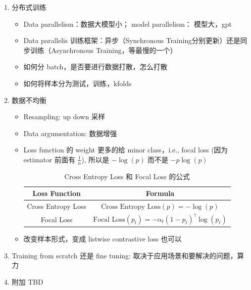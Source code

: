 \documentclass[12pt]{article}
\numberwithin{theorem}{section} %
\numberwithin{definition}{section} %
\numberwithin{assumption}{section} %
\numberwithin{lemma}{section} %
\numberwithin{remark}{section} %
\numberwithin{prop}{section} %
\numberwithin{corollary}{section} %
\numberwithin{example}{section} %
\numberwithin{question}{section} %
\numberwithin{problem}{section} %
\numberwithin{conjecture}{section} %
\numberwithin{append}{section} %
\numberwithin{property}{section} %
\begin{document}
\begin{CJK}{UTF8}{gbsn}
\begin{enumerate}
			\item 分布式训练
			\begin{itemize}
				\item Data parallelism：数据大模型小； model parallelism： 模型大，gpt
				\item Data parallelis 训练框架：异步（Synchronous Training分别更新）还是同步训练（Asynchronous Training，等最慢的一个）
				\item 如何分 batch，是否要进行数据打散，怎么打散
				\item 如何将样本分为测试，训练，kfolds
			\end{itemize}
			\item 数据不均衡
			\begin{itemize}
				\item Resampling: up down 采样
				\item Data argumentation: 数据增强
				\item Loss function 的 weight 更多的给 minor class，i.e.,  focal loss	(因为 estimator 前面有 $\frac{1}{n}$), 所以是	$-\log(p) $	而不是 $-p\log(p) $
				\begin{table}[h]
					\centering
					\begin{tabular}{cc}
						\toprule
						\textbf{Loss Function} & \textbf{Formula} \\ 
						\midrule
						Cross Entropy Loss & 
						$ \text{Cross Entropy Loss}(p) = -\log(p) $ \\ 
						\midrule
						Focal Loss & 
						$ \text{Focal Loss}(p_t) = -\alpha_t (1 - p_t)^\gamma \log(p_t) $ \\ 
						\bottomrule
					\end{tabular}
					\caption{Cross Entropy Loss 和 Focal Loss 的公式}
					\label{tab:loss_functions}
				\end{table}
			\item 改变样本形式，变成 listwise contrastive loss 也可以
		\end{itemize}
		\item Training from scratch 还是 fine tuning: 取决于应用场景和要解决的问题，算力
		\item 附加 TBD
	\end{enumerate}
	


	

\end{CJK}
\end{document}
